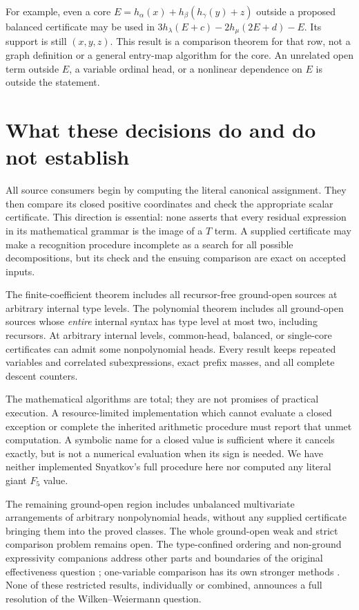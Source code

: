 \documentclass[11pt]{article}
\begin{document}
For example, even a core $E=h_\alpha(x)+h_\beta(h_\gamma(y)+z)$ outside
a proposed balanced certificate may be used in
$3h_\lambda(E+c)-2h_\mu(2E+d)-E$. Its support is still $(x,y,z)$.
This result is a comparison theorem for that row, not a graph definition
or a general entry-map algorithm for the core. An unrelated open term
outside $E$, a variable ordinal head, or a nonlinear dependence on $E$
is outside the statement.

\section{What these decisions do and do not establish}
All source consumers begin by computing the literal canonical assignment.
They then compare its closed positive coordinates and check the appropriate
scalar certificate. This direction is essential: none asserts that every
residual expression in its mathematical grammar is the image of a $T$ term.
A supplied certificate may make a recognition procedure incomplete as a
search for all possible decompositions, but its check and the ensuing
comparison are exact on accepted inputs.

The finite-coefficient theorem includes all recursor-free ground-open
sources at arbitrary internal type levels. The polynomial theorem includes
all ground-open sources whose \emph{entire} internal syntax has type level
at most two, including recursors. At arbitrary internal levels, common-head,
balanced, or single-core certificates can admit some nonpolynomial heads.
Every result keeps repeated variables and correlated subexpressions, exact
prefix masses, and all complete descent counters.

The mathematical algorithms are total; they are not promises of practical
execution. A resource-limited implementation which cannot evaluate a closed
exception or complete the inherited arithmetic procedure must report that
unmet computation. A symbolic name for a closed value is sufficient where
it cancels exactly, but is not a numerical evaluation when its sign is
needed. We have neither implemented Snyatkov's full procedure here nor
computed any literal giant $F_5$ value.

The remaining ground-open region includes unbalanced multivariate
arrangements of arbitrary nonpolynomial heads, without any supplied
certificate bringing them into the proved classes. The whole ground-open
weak and strict comparison problem remains open. The type-confined ordering
and non-ground expressivity companions address other parts and boundaries
of the original effectiveness question \cite{wwordering,wwexpressivity};
one-variable comparison has its own stronger methods
\cite{wwunivariate}. None of these restricted results, individually or
combined, announces a full resolution of the Wilken--Weiermann question.


\end{document}
